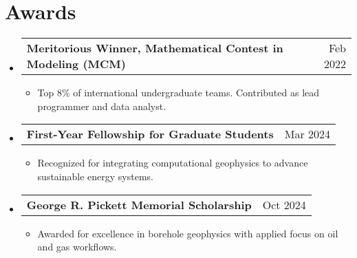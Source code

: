 \documentclass[letterpaper,13pt]{article}
\makeatletter
\newcommand{\resumeItem}[1]{\item\small{{#1 \vspace{-2pt}}}}
\newcommand{\resumeProjectHeading}[2]{
    \item
    \begin{tabular*}{0.97\textwidth}{l@{\extracolsep{\fill}}r}
      \small#1 & #2 \\
    \end{tabular*}\vspace{-7pt}
}
\newcommand{\resumeItemListStart}{\begin{itemize}}
\newcommand{\resumeItemListEnd}{\end{itemize}\vspace{-5pt}}
\newcommand{\resumeSubHeadingListStart}{\begin{itemize}[leftmargin=0.15in, label={}]}
\newcommand{\resumeSubHeadingListEnd}{\end{itemize}}
\makeatother
\begin{document}
\section{Awards}
\resumeSubHeadingListStart

\resumeProjectHeading
  {\textbf{Meritorious Winner, Mathematical Contest in Modeling (MCM)}}{Feb 2022}
\resumeItemListStart
  \resumeItem{Top 8\% of international undergraduate teams. Contributed as lead programmer and data analyst.}
\resumeItemListEnd

\resumeProjectHeading
  {\textbf{First-Year Fellowship for Graduate Students}}{Mar 2024}
\resumeItemListStart
  \resumeItem{Recognized for integrating computational geophysics to advance sustainable energy systems.}
\resumeItemListEnd

\resumeProjectHeading
  {\textbf{George R. Pickett Memorial Scholarship}}{Oct 2024}
\resumeItemListStart
  \resumeItem{Awarded for excellence in borehole geophysics with applied focus on oil and gas workflows.}
\resumeItemListEnd

\resumeSubHeadingListEnd
\end{document}
